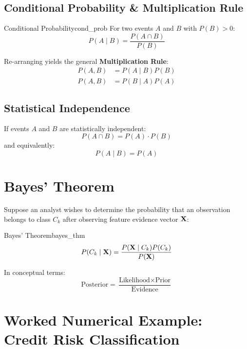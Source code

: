 \subsection{Conditional Probability \& Multiplication Rule}

\begin{definition}{Conditional Probability}{cond_prob}
For two events $A$ and $B$ with $P(B) > 0$:
\begin{equation}
P(A \mid B) = \frac{P(A \cap B)}{P(B)}
\end{equation}
\end{definition}

\noindent Re-arranging yields the general \textbf{Multiplication Rule}:
\begin{align}
P(A, B) &= P(A \mid B) P(B) \\
P(A, B) &= P(B \mid A) P(A)
\end{align}

\subsection{Statistical Independence}
If events $A$ and $B$ are statistically independent:
\begin{equation}
P(A \cap B) = P(A) \cdot P(B)
\end{equation}
and equivalently:
\begin{equation}
P(A \mid B) = P(A)
\end{equation}

\section{Bayes' Theorem}

Suppose an analyst wishes to determine the probability that an observation belongs to class $C_k$ after observing feature evidence vector $\mathbf{X}$:

\begin{theorem}{Bayes' Theorem}{bayes_thm}
\begin{equation}
P(C_k \mid \mathbf{X}) = \frac{P(\mathbf{X} \mid C_k) P(C_k)}{P(\mathbf{X})}
\end{equation}
\end{theorem}

\noindent In conceptual terms:
\begin{equation}
\text{Posterior} = \frac{\text{Likelihood} \times \text{Prior}}{\text{Evidence}}
\end{equation}

\section{Worked Numerical Example: Credit Risk Classification}

